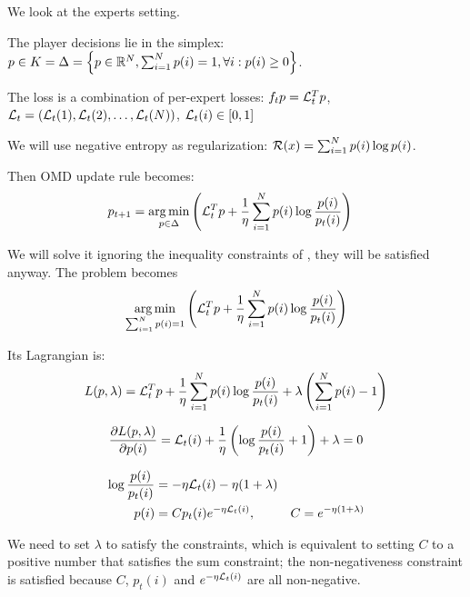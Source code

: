 \documentclass[11pt]{article}
\theoremstyle{definition}
\theoremstyle{definition}
\newcommand{\pth}[1]{\left( #1\right)}                 %
\newcommand{\brk}[1]{\left[ #1\right]}                 %
\newcommand{\braces}[1]{\left\lbrace #1\right\rbrace } %
\newcommand{\Kset}{\ensuremath{K}}
\begin{document}
We look at the experts setting.

The player decisions lie in the simplex: $ p \in \Kset = \simplex = \braces{ p \in \reals^N, \sum_{i=1}^{N} p(i) = 1, \forall i: p(i) \geq 0 } $.

The loss is a combination of per-expert losses: $ f_t{p} = {\mathcal L}_t^T p $, $ \L_t = \pth{ \L_t(1), \L_t(2), \dots , \L_t(N)} $, $ \L_t(i) \in \brk{0, 1}$

We will use negative entropy as regularization: $ \mathcal R(x) = \sum_{i=1}^{N} p(i) \log p(i) $.

Then OMD update rule becomes:
\begin{equation*}
\begin{aligned}
p_{t+1}
&= \argmin_{p \in \simplex} \pth{ \L_t^T p + \frac{1}{\eta} \sum_{i=1}^{N} p(i) \log \frac{p(i)}{p_t(i)} }
\end{aligned}
\end{equation*}

We will solve it ignoring the inequality constraints of \simplex{}, they will be satisfied anyway.
The problem becomes
\begin{equation*}
\argmin_{\sum_{i=1}^{N} p(i) = 1} \pth{ \L_t^T p + \frac{1}{\eta} \sum_{i=1}^{N} p(i) \log \frac{p(i)}{p_t(i)} }
\end{equation*}

Its Lagrangian is:
\begin{equation*}
L(p, \lambda) = \L_t^T p + \frac{1}{\eta} \sum_{i=1}^{N} p(i) \log \frac{p(i)}{p_t(i)} + \lambda \pth{ \sum_{i=1}^{N} p(i) - 1 }
\end{equation*}

\begin{equation*}
\frac{\partial L(p, \lambda) }{\partial p(i)} = \L_t(i) + \frac{1}{\eta} \pth{ \log \frac{p(i)}{p_t(i)} + 1} + \lambda = 0
\end{equation*}

\begin{equation*}
\begin{aligned}
\log \frac{p(i)}{p_t(i)} &= -\eta {\mathcal L}_t(i) - \eta (1 + \lambda)
\\
p(i) &= C p_t(i) e^{-\eta {\mathcal L}_t(i)}, & C = e^{-\eta (1+\lambda)} 
\end{aligned}
\end{equation*}

We need to set $\lambda$ to satisfy the constraints, which is equivalent to setting $C$ to a positive number that satisfies the sum constraint; the non-negativeness constraint is satisfied because $C$, $p_t(i)$ and $e^{-\eta {\mathcal L}_t(i)}$ are all non-negative.
\end{document}
